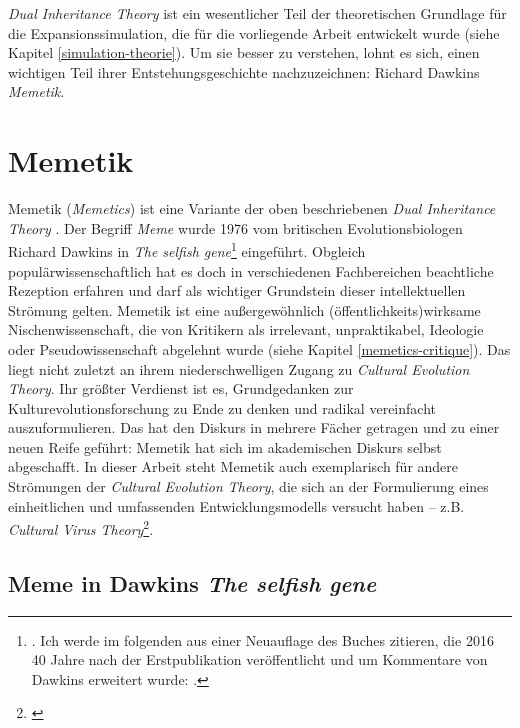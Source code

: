 \documentclass[openany,twoside,twocolumn]{book}
\let\rmarkdownfootnote\footnote%
\def\footnote{\protect\rmarkdownfootnote}
\begin{document}
\emph{Dual Inheritance Theory} ist ein wesentlicher Teil der
theoretischen Grundlage für die Expansionssimulation, die für die
vorliegende Arbeit entwickelt wurde (siehe Kapitel
\ref{simulation-theorie}). Um sie besser zu verstehen, lohnt es sich,
einen wichtigen Teil ihrer Entstehungsgeschichte nachzuzeichnen: Richard
Dawkins \emph{Memetik}.

\hypertarget{memetics}{%
\section{Memetik}\label{memetics}}

Memetik (\emph{Memetics}) ist eine Variante der oben beschriebenen
\emph{Dual Inheritance Theory} . Der Begriff \emph{Meme} wurde 1976 vom
britischen Evolutionsbiologen Richard Dawkins in \emph{The selfish
gene}\footnote{\textcite{Dawkinsselfishgene1976}. Ich werde im folgenden
  aus einer Neuauflage des Buches zitieren, die 2016 40 Jahre nach der
  Erstpublikation veröffentlicht und um Kommentare von Dawkins erweitert
  wurde: \textcite{Dawkinsselfishgene40th2016}.} eingeführt. Obgleich
populärwissenschaftlich hat es doch in verschiedenen Fachbereichen
beachtliche Rezeption erfahren und darf als wichtiger Grundstein dieser
intellektuellen Strömung gelten. Memetik ist eine außergewöhnlich
(öffentlichkeits)wirksame Nischenwissenschaft, die von Kritikern als
irrelevant, unpraktikabel, Ideologie oder Pseudowissenschaft abgelehnt
wurde (siehe Kapitel \ref{memetics-critique}). Das liegt nicht zuletzt
an ihrem niederschwelligen Zugang zu \emph{Cultural Evolution Theory}.
Ihr größter Verdienst ist es, Grundgedanken zur
Kulturevolutionsforschung zu Ende zu denken und radikal vereinfacht
auszuformulieren. Das hat den Diskurs in mehrere Fächer getragen und zu
einer neuen Reife geführt: Memetik hat sich im akademischen Diskurs
selbst abgeschafft. In dieser Arbeit steht Memetik auch exemplarisch für
andere Strömungen der \emph{Cultural Evolution Theory}, die sich an der
Formulierung eines einheitlichen und umfassenden Entwicklungsmodells
versucht haben -- z.B. \emph{Cultural Virus Theory}\footnote{\textcite{cullen_contagious_2000}}.

\hypertarget{memetics-dawkins}{%
\subsection{\texorpdfstring{Meme in Dawkins \emph{The selfish
gene}}{Meme in Dawkins The selfish gene}}\label{memetics-dawkins}}
\end{document}

